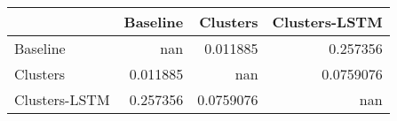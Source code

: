 \begin{tabular}{lrrr}
\toprule
               &   Baseline &    Clusters &   Clusters-LSTM \\
\midrule
 Baseline      & nan        &   0.011885  &       0.257356  \\
 Clusters      &   0.011885 & nan         &       0.0759076 \\
 Clusters-LSTM &   0.257356 &   0.0759076 &     nan         \\
\bottomrule
\end{tabular}